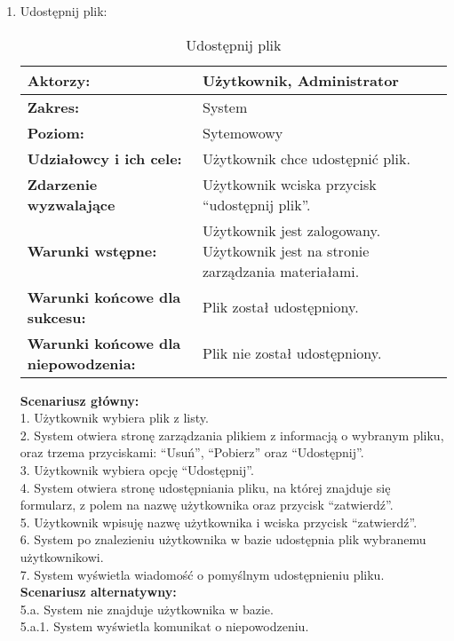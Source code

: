 \begin{enumerate}[label=(\Roman*)]
\item Udostępnij plik:
	\begin{table}[H]
\centering
\caption{Udostępnij plik}
\label{Udostepnijplik}
\begin{tabular}{|p{7cm}|p{7cm}|}
  \hline 
  \textbf{Aktorzy:} & Użytkownik, Administrator\\
  \hline
  \textbf{Zakres:} & System \\
	\hline
  \textbf{Poziom:} & Sytemowowy \\
	\hline
  \textbf{Udziałowcy i ich cele: } & Użytkownik chce udostępnić plik. \\
	\hline
  \textbf{Zdarzenie wyzwalające } & Użytkownik wciska przycisk “udostępnij plik”. \\
	\hline
  \textbf{Warunki wstępne: } & Użytkownik jest zalogowany. Użytkownik jest na stronie zarządzania materiałami.
 \\
	\hline
  \textbf{Warunki końcowe dla sukcesu:} & Plik został udostępniony.
 \\
	\hline
  \textbf{Warunki końcowe dla niepowodzenia:} & Plik nie został udostępniony. \\
  \hline
\end{tabular} 
\end{table}

\textbf{Scenariusz główny:}\\
1. Użytkownik wybiera plik z listy.\\
2. System otwiera stronę zarządzania plikiem z informacją o wybranym pliku, oraz trzema przyciskami: “Usuń”, “Pobierz” oraz “Udostępnij”.\\
3. Użytkownik wybiera opcję “Udostępnij”.\\
4. System otwiera stronę udostępniania pliku, na której znajduje się formularz, z polem na nazwę użytkownika oraz przycisk “zatwierdź”.\\
5. Użytkownik wpisuję nazwę użytkownika i wciska przycisk “zatwierdź”.\\
6. System po znalezieniu użytkownika w bazie udostępnia plik wybranemu użytkownikowi.\\
7. System wyświetla wiadomość o pomyślnym udostępnieniu pliku.\\
\textbf{Scenariusz alternatywny:}\\
5.a. System nie znajduje użytkownika w bazie.\\
5.a.1. System wyświetla komunikat o niepowodzeniu.\\


\end{enumerate}
